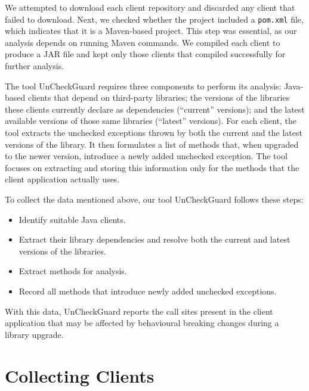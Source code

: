 We attempted to download each client repository and discarded any client that failed to download.
Next, we checked whether the project included a \texttt{pom.xml} file, which indicates that it is a Maven-based project. This step was essential, as our analysis depends on running Maven commands. We compiled each client to produce a JAR file and kept only those clients that compiled successfully for further analysis.


The tool UnCheckGuard requires three components to perform its analysis: Java-based clients that depend on third-party libraries; the versions of the libraries these clients currently declare as dependencies (“current” versions); and the latest available versions of those same libraries (“latest” versions). For each client, the tool extracts the unchecked exceptions thrown by both the current and the latest versions of the library. It then formulates a list of methods that, when upgraded to the newer version, introduce a newly added unchecked exception. The tool focuses on extracting and storing this information only for the methods that the client application actually uses.


To collect the data mentioned above, our tool UnCheckGuard follows these steps:
\begin{itemize}
    \item Identify suitable Java clients.
    \item Extract their library dependencies and resolve both the current and latest versions of the libraries.
    \item Extract methods for analysis.
    \item Record all methods that introduce newly added unchecked exceptions.
\end{itemize}
With this data, UnCheckGuard reports the call sites present in the client application that may be affected by behavioural breaking changes during a library upgrade.

\section{Collecting Clients}


